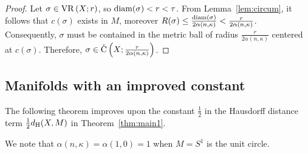 \documentclass[11pt, reqno, english]{amsart}
\begin{document}
\begin{proof}
Let $\sigma\in\mathrm{VR}\left(X;r\right)$, so $\mathrm{diam}(\sigma) < r <\tau$.
From Lemma~\ref{lem:circum}, it follows that $c(\sigma)$ exists in $M$, moreover $R(\sigma)\le\frac{\mathrm{diam}(\sigma)}{2\alpha(n,\kappa)}<\frac{r}{2\alpha(n,\kappa)}$.
Consequently, $\sigma$ must be contained in the metric ball of radius $\frac{r}{2\alpha(n,\kappa)}$ centered at $c(\sigma)$.
Therefore, $\sigma\in\mathrm{\check{C}}\left(X;\tfrac{r}{2\alpha(n,\kappa)}\right)$.
\end{proof}

\subsection*{Manifolds with an improved constant}
\label{sec:manifold}

The following theorem improves upon the constant $\frac{1}{2}$ in the Hausdorff distance term $\tfrac{1}{2}d_{\mathrm{H}}(X,M)$ in Theorem~\ref{thm:main1}.

\vspace{3mm}
\mainFour*
\vspace{3mm}

We note that $\alpha(n,\kappa)=\alpha(1,0)=1$ when $M=S^1$ is the unit circle.
\end{document}
